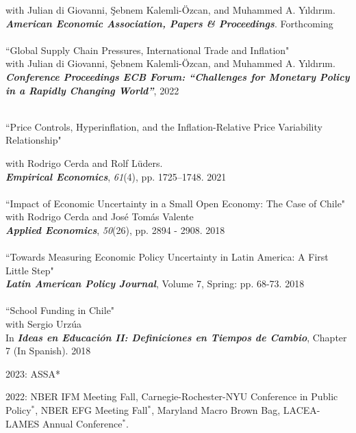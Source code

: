 \documentclass[10pt]{article}
\begin{document}
\begin{description}[leftmargin=10em,style=nextline]
      with Julian di Giovanni, \c{S}ebnem Kalemli-\"{O}zcan, and Muhammed A. Y{\i}ld{\i}r{\i}m. \\
      \textbf{\textit{American Economic Association, Papers \& Proceedings}}. Forthcoming\\
     \\[-0.1in]
      ``Global Supply Chain Pressures, International Trade and Inflation"\\
     with Julian di Giovanni, \c{S}ebnem Kalemli-\"{O}zcan, and Muhammed A. Y{\i}ld{\i}r{\i}m. \\
     \textbf{\textit{Conference Proceedings ECB Forum: ``Challenges for Monetary Policy in a Rapidly Changing World''}}, 2022\\
    \\[-0.2in]
    \item[Pre Ph.D.]
     ``Price Controls, Hyperinflation, and the Inflation-Relative Price Variability Relationship"\\[-.225in]
     \item[Publications]
     with Rodrigo Cerda and Rolf L\"{u}ders. \\
     \textbf{\textit{Empirical Economics}}, \emph{61}(4), pp. 1725--1748. 2021\\
    \\[-0.1in]
     ``Impact of Economic Uncertainty in a Small Open Economy: The Case of Chile"\\
     with Rodrigo Cerda and Jos\'e Tom\'as Valente \\
     \textbf{\textit{Applied Economics}}, \textit{50}(26), pp. 2894 - 2908. 2018\\
    \\[-0.1in]
     ``Towards Measuring Economic Policy Uncertainty in Latin America: A First Little Step" \\
     \textbf{\textit{Latin American Policy Journal}}, Volume 7, Spring: pp. 68-73. 2018\\
    \\[-0.1in]
     ``School Funding in Chile"\\
     with Sergio Urz\'ua \\
     In  \textbf{\textit{Ideas en Educaci\'on II: Definiciones en Tiempos de Cambio}}, Chapter 7 (In Spanish). 2018\\[-0.1in]
     \item[Conference] 2023: ASSA*\\[-0.225in]
      \item[Presentations] 2022: NBER IFM Meeting Fall, Carnegie-Rochester-NYU Conference in Public Policy$^\ast$, NBER EFG Meeting Fall$^\ast$, Maryland Macro Brown Bag, LACEA-LAMES Annual Conference$^\ast$.\\

\end{description}
\end{document}
